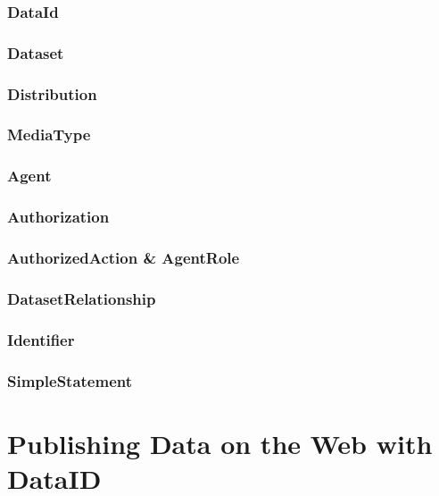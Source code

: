 \documentclass[a4paper,english,twoside,BCOR1.5cm,headsepline,DIV12,appendixprefix,final,12pt]{scrbook}
\begin{document}
\subsection{DataId} 
\label{sec:coredataid}

\subsection{Dataset} 
\label{sec:coredataset}

\subsection{Distribution} 
\label{sec:coredist}

\subsection{MediaType} 
\label{sec:coremediatype}

\subsection{Agent} 
\label{sec:coreagent}

\subsection{Authorization} 
\label{sec:coreauthorization}

\subsection{AuthorizedAction \& AgentRole} 
\label{sec:coreaction}

\subsection{DatasetRelationship} 
\label{sec:corerelation}

\subsection{Identifier} 
\label{sec:coreidentifier}

\subsection{SimpleStatement} 
\label{sec:corestatement}

\chapter{Publishing Data on the Web with DataID}
\label{chap:bestprctice}
\end{document}
